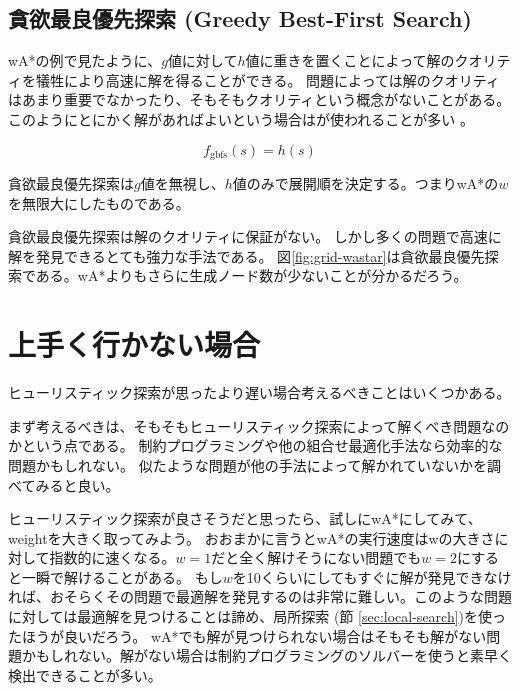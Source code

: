 \subsection{貪欲最良優先探索 (Greedy Best-First Search)}
\label{sec:greedy-best-first-search}

wA*の例で見たように、$g$値に対して$h$値に重きを置くことによって解のクオリティを犠牲により高速に解を得ることができる。
問題によっては解のクオリティはあまり重要でなかったり、そもそもクオリティという概念がないことがある。
このようにとにかく解があればよいという場合はが使われることが多い \cite{wilt2010comparison}。

\begin{equation}
  f_{\text{gbfs}}(s) = h(s)
\end{equation}

貪欲最良優先探索は$g$値を無視し、$h$値のみで展開順を決定する。つまりwA*の$w$を無限大にしたものである。

貪欲最良優先探索は解のクオリティに保証がない。
しかし多くの問題で高速に解を発見できるとても強力な手法である。
図\ref{fig:grid-wastar}は貪欲最良優先探索である。wA*よりもさらに生成ノード数が少ないことが分かるだろう。



\section{上手く行かない場合}

ヒューリスティック探索が思ったより遅い場合考えるべきことはいくつかある。

まず考えるべきは、そもそもヒューリスティック探索によって解くべき問題なのかという点である。
制約プログラミングや他の組合せ最適化手法なら効率的な問題かもしれない。
似たような問題が他の手法によって解かれていないかを調べてみると良い。

ヒューリスティック探索が良さそうだと思ったら、試しにwA*にしてみて、weightを大きく取ってみよう。
おおまかに言うとwA*の実行速度はwの大きさに対して指数的に速くなる。$w=1$だと全く解けそうにない問題でも$w=2$にすると一瞬で解けることがある。
もし$w$を10くらいにしてもすぐに解が発見できなければ、おそらくその問題で最適解を発見するのは非常に難しい。このような問題に対しては最適解を見つけることは諦め、局所探索 (節 \ref{sec:local-search})を使ったほうが良いだろう。
wA*でも解が見つけられない場合はそもそも解がない問題かもしれない。解がない場合は制約プログラミングのソルバーを使うと素早く検出できることが多い。

